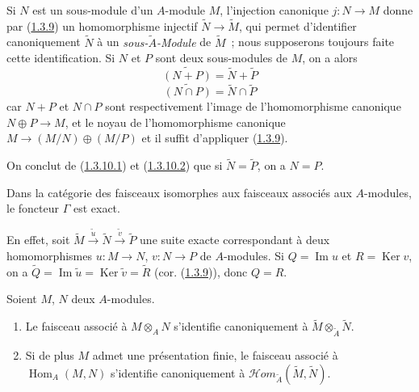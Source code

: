 \begin{env}[1.3.10]
\label{I.1.3.10-fr}
Si $N$ est un sous-module d'un $A$-module $M$, l'injection canonique
$j:N\to M$ donne par (\hyperref[I.1.3.9-fr]{1.3.9}) un homomorphisme injectif
$\widetilde{N}\to\widetilde{M}$, qui permet d'identifier canoniquement
$\widetilde{N}$ à un \emph{sous-$\widetilde{A}$-Module} de $\widetilde{M}$~;
nous supposerons toujours faite cette identification. Si $N$ et $P$ sont deux
sous-modules de $M$, on a alors
\begin{equation}
  \widetilde{(N+P)}=\widetilde{N}+\widetilde{P}
  \tag{1.3.10.1}\label{I.1.3.10.1-fr}
\end{equation}
\begin{equation}
  \widetilde{(N\cap P)}=\widetilde{N}\cap\widetilde{P}
  \tag{1.3.10.2}\label{I.1.3.10.2-fr}
\end{equation}
car $N+P$ et $N\cap P$ sont respectivement l'image de l'homomorphisme
canonique $N\oplus P\to M$, et le noyau de l'homomorphisme canonique
$M\to(M/N)\oplus(M/P)$ et il suffit d'appliquer
(\hyperref[I.1.3.9-fr]{1.3.9}).

On conclut de (\hyperref[I.1.3.10.1-fr]{1.3.10.1}) et
(\hyperref[I.1.3.10.2-fr]{1.3.10.2}) que si
$\widetilde{N}=\widetilde{P}$, on a $N=P$.
\end{env}

\begin{corollary}[1.3.11]
\label{I.1.3.11-fr}
Dans la catégorie des faisceaux isomorphes aux faisceaux associés aux
$A$-modules, le foncteur $\Gamma$ est exact.
\end{corollary}

En effet, soit
$\widetilde{M}\xrightarrow{\widetilde{u}}\widetilde{N}
\xrightarrow{\widetilde{v}}\widetilde{P}$ une suite exacte correspondant à
deux homomorphismes $u:M\to N$, $v:N\to P$ de $A$-modules. Si
$Q=\operatorname{Im}u$ et $R=\operatorname{Ker}v$, on a
$\widetilde{Q}=\operatorname{Im}\widetilde{u}
=\operatorname{Ker}\widetilde{v}=\widetilde{R}$
(cor. (\hyperref[I.1.3.9-fr]{1.3.9})), donc $Q=R$.

\begin{corollary}[1.3.12]
\label{I.1.3.12-fr}
Soient $M$, $N$ deux $A$-modules.
\begin{enumerate}
  \item[\rm(i)] Le faisceau associé à $M\otimes_A N$ s'identifie
  canoniquement à $\widetilde{M}\otimes_{\widetilde{A}}\widetilde{N}$.
  \item[\rm(ii)] Si de plus $M$ admet une présentation finie, le faisceau
  associé à $\operatorname{Hom}_A(M,N)$ s'identifie canoniquement à
  $\mathscr{H}\!om_{\widetilde{A}}(\widetilde{M},\widetilde{N})$.
\end{enumerate}
\end{corollary}

